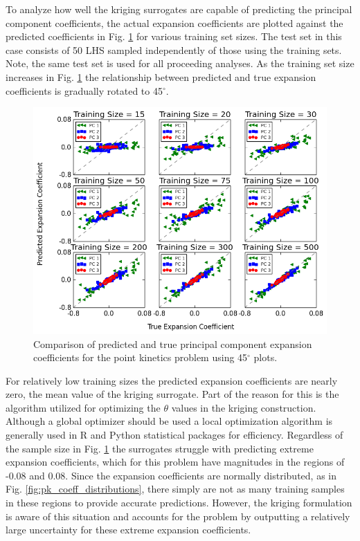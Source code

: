 To analyze how well the kriging surrogates are capable of predicting the principal component coefficients, the actual expansion coefficients are plotted against the predicted coefficients in Fig. \ref{fig:pk_45degree} for various training set sizes. The test set in this case consists of 50 \ac{LHS} sampled independently of those using the training sets. Note, the same test set is used for all proceeding analyses. As the training set size increases in Fig. \ref{fig:pk_45degree} the relationship between predicted and true expansion coefficients is gradually rotated to 45$^\circ$.      
\begin{figure}[!h]
\caption{\label{fig:pk_45degree}
Comparison of predicted and true principal component expansion coefficients for the point kinetics problem using 45$^\circ$ plots.}
 \begin{center}
  \includegraphics[scale=.7]{./Chapter4/pk_45degree.png}
 \end{center}
\end{figure}
For relatively low training sizes the predicted expansion coefficients are nearly zero, the mean value of the kriging surrogate. Part of the reason for this is the algorithm utilized for optimizing the $\theta$ values in the kriging construction. Although a global optimizer should be used a local optimization algorithm is generally used in R \cite{R} and Python statistical packages for efficiency. Regardless of the sample size in Fig. \ref{fig:pk_45degree} the surrogates struggle with predicting extreme expansion coefficients, which for this problem have magnitudes in the regions of -0.08 and 0.08. Since the expansion coefficients are normally distributed, as in Fig. \ref{fig:pk_coeff_distributions}, there simply are not as many training samples in these regions to provide accurate predictions. However, the kriging formulation is aware of this situation and accounts for the problem by outputting a relatively large uncertainty for these extreme expansion coefficients. 
